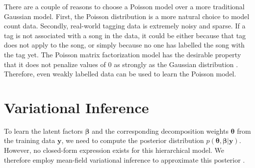 There are a couple of reasons to choose a Poisson model over a more traditional Gaussian model\cite{salakhutdinov2007probabilistic}. First, the Poisson distribution is a more natural choice to model count data. Secondly, real-world tagging data is extremely noisy and sparse. If a tag is not associated with a song in the data, it could be either because that tag does not apply to the song, or simply because no one has labelled the song with the tag yet. The Poisson matrix factorization model has the desirable property that it does not penalize values of $0$ as strongly as the Gaussian distribution \cite{paisley2015handbook}. Therefore, even weakly labelled data can be used to learn the Poisson model.  

\section{Variational Inference}\label{sec:inference}

To learn the latent factors $\boldsymbol{\beta}$ and the corresponding decomposition weights $\boldsymbol{\theta}$ from the training data $\boldsymbol{y}$, we need to compute the posterior distribution $p(\boldsymbol{\theta}, \boldsymbol{\beta} | \boldsymbol{y})$. However, no closed-form expression exists for this hierarchical model. We therefore employ mean-field variational inference to approximate this posterior \cite{jordan1999introduction}.

